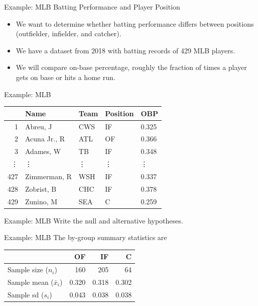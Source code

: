 \begin{frame}{Example: MLB Batting Performance and Player Position}
    \begin{itemize}
        \item We want to determine whether batting performance differs between positions (outfielder, infielder, and catcher).
        \item We have a dataset from 2018 with batting records of 429 MLB players.
        \item We will compare on-base percentage, roughly the fraction of times a player gets on base or hits a home run.
    \end{itemize}
\end{frame}

\begin{frame}{Example: MLB}
    \begin{table}
        \centering%
        \begin{tabular}{r llll}
            \hline
            & Name & Team & Position & OBP \\ 
            \hline
            1 & Abreu, J & CWS & IF & 0.325 \\
            2 & Acuna Jr., R & ATL & OF & 0.366\\
            3 & Adames, W & TB & IF & 0.348 \\
            \vdots & \vdots & \vdots & \vdots & \vdots \\
            427 & Zimmerman, R & WSH & IF & 0.337 \\
            428 & Zobrist, B & CHC & IF & 0.378 \\
            429 & Zunino, M & SEA & C & 0.259 \\
             \hline
        \end{tabular}
    \end{table}
\end{frame}

\begin{frame}{Example: MLB}
    Write the null and alternative hypotheses.
\end{frame}

\begin{frame}{Example: MLB}
    The by-group summary statistics are
    \begin{table}[]
        \centering%
        \begin{tabular}{l rrr}
            \hline
            & OF & IF & C \\
            \hline
            Sample size ($n_i$) & 160 & 205 & 64 \\
            Sample mean ($\bar{x}_i$) & 0.320 & 0.318 & 0.302 \\
            Sample sd ($s_i$) & 0.043 & 0.038 & 0.038 \\
            \hline
        \end{tabular}
    \end{table}
\end{frame}

